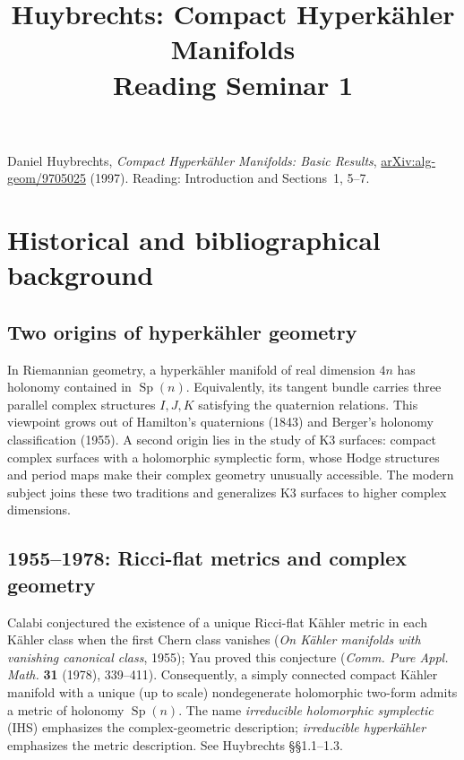 \documentclass[11pt]{article}
\title{Huybrechts: Compact Hyperk\"ahler Manifolds\\Reading Seminar 1}
\date{}
\begin{document}
\maketitle
{\small\tableofcontents}

\noindent
Daniel Huybrechts, \emph{Compact Hyperk\"ahler Manifolds:
Basic Results}, \href{https://arxiv.org/abs/alg-geom/9705025}
{arXiv:alg-geom/9705025} (1997).
Reading: Introduction and Sections~1, 5--7.

\section{Historical and bibliographical background}

\subsection{Two origins of hyperk\"ahler geometry}
In Riemannian geometry, a hyperk\"ahler manifold
of real dimension $4n$ has holonomy contained in
$\operatorname{Sp}(n)$. Equivalently, its tangent
bundle carries three parallel complex structures
$I,J,K$ satisfying the quaternion relations.
This viewpoint grows out of Hamilton's quaternions
(1843) and Berger's holonomy classification (1955).
A second origin lies in the study of K3 surfaces:
compact complex surfaces with a holomorphic
symplectic form, whose Hodge structures and
period maps make their complex geometry unusually
accessible. The modern subject joins these two
traditions and generalizes K3 surfaces to higher
complex dimensions.

\subsection{1955--1978: Ricci-flat metrics and complex geometry}
Calabi conjectured the existence of a unique
Ricci-flat K\"ahler metric in each K\"ahler class
when the first Chern class vanishes
(\emph{On K\"ahler manifolds with vanishing
canonical class}, 1955); Yau proved this
conjecture (\emph{Comm. Pure Appl. Math.}
\textbf{31} (1978), 339--411).
Consequently, a simply connected compact
K\"ahler manifold with a unique (up to scale)
nondegenerate holomorphic two-form admits
a metric of holonomy $\operatorname{Sp}(n)$.
The name \emph{irreducible holomorphic symplectic}
(IHS) emphasizes the complex-geometric description;
\emph{irreducible hyperk\"ahler} emphasizes the metric
description. See Huybrechts \S\S1.1--1.3.
\end{document}
